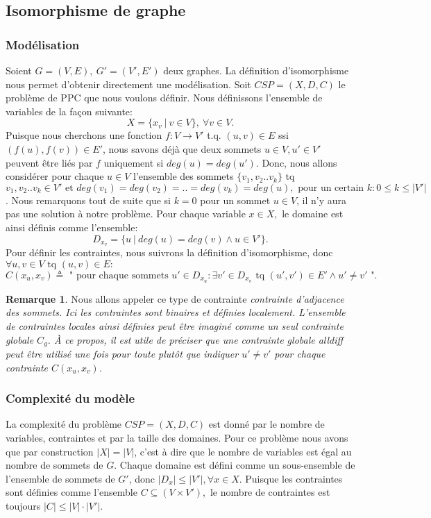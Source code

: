 \documentclass[french]{article}
\theoremstyle{definition}
\newtheorem{rem}{Remarque}[section]
\theoremstyle{remark}
\begin{document}
\subsection{Isomorphisme de graphe}
\subsubsection{Modélisation}
\label{sssec:model1}
Soient $G=(V, E),\ G'=(V', E')$ deux graphes. 
La définition d'isomorphisme nous permet d'obtenir directement une modélisation. Soit $CSP = (X, D, C)$ le problème de PPC que nous voulons définir. Nous définissons l'ensemble de variables de la façon suivante: 
$$X=\{x_v\ |\ v \in V \},\ \forall v \in V.$$
Puisque nous cherchons une fonction  $f: V \rightarrow V'$ t.q. $ (u,v) \in E$ ssi $ (f(u), f(v)) \in E'$, nous savons déjà que deux sommets $u \in V, u' \in V'$ peuvent être liés par $f$ uniquement si $deg(u) = deg(u')$. Donc, nous allons considérer pour chaque $u \in V$ l'ensemble des sommets $\{v_1, v_2..v_k\}$ tq $v_1, v_2..v_k \in V' \text{ et } deg(v_1)=deg(v_2)=..=deg(v_k)=deg(u), \text{ pour un certain } k: 0 \leq k \leq |V'|$. Nous remarquons tout de suite que si $k=0$ pour un sommet $u \in V$, il n'y aura pas une solution à notre problème. Pour chaque variable $x \in X,$ le domaine est ainsi définis comme l'ensemble: 
$$D_{x_v}=\{u\ |\ deg(u) = deg(v) \land u \in V'\}.$$
Pour définir les contraintes, nous suivrons la définition d'isomorphisme, donc $\forall u, v \in V \text{ tq } (u,v) \in E:$
$$C(x_u, x_v) \triangleq \text{ " pour chaque sommets } u' \in D_{x_u}: \exists v' \in D_{x_v} \text{ tq } (u', v') \in E' \land u' \neq v' \text{ "}.$$
\begin{rem}
	\label{rem:contraintes}
	Nous allons appeler ce type de contrainte \it contrainte d'adjacence des sommets\rm. Ici les contraintes sont binaires et définies localement. L'ensemble de contraintes locales ainsi définies peut être imaginé comme un seul contrainte globale $C_g$. À ce propos, il est utile de préciser que une contrainte globale \it alldiff \rm peut être utilisé une fois pour toute plutôt que indiquer $u' \neq v'$ pour chaque contrainte $C(x_u, x_v)$.
\end{rem}
\subsubsection{Complexité du modèle}
\label{subsubsec:compl1}
La complexité du problème $CSP=(X,D,C)$ est donné par le nombre de variables, contraintes et par la taille des domaines. Pour ce problème nous avons que par construction $|X|=|V|$, c'est à dire que le nombre de variables est égal au nombre de sommets de $G$. Chaque domaine est défini comme un sous-ensemble de l'ensemble de sommets de $G'$, donc $|D_x| \leq |V'|, \forall x \in X.$ Puisque les contraintes sont définies comme l'ensemble $C \subseteq (V \times V'),$ le nombre de contraintes est toujours $|C| \leq |V| \cdot |V'|.$
\end{document}
